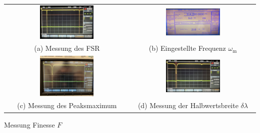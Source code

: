 \begin{center}
    \captionsetup{type=figure}
    \begin{tabular}{c c}
        \includegraphics[width=0.45\textwidth]{Bilder/Finess/finess_fsr_oszi.jpg} & \includegraphics[width=0.45\textwidth]{Bilder/Finess/finess_hf-generator.jpg}\\
        (a) Messung des FSR & (b) Eingestellte Frequenz  $\omega_\mathrm{m}$ \\[0,1cm]
        \includegraphics[width=0.45\textwidth]{Bilder/Finess/finess_max_oszi.jpg} & \includegraphics[width=0.45\textwidth]{Bilder/Finess/finess_hb_oszi.jpg}\\
        (c) Messung des Peaksmaximum & (d) Messung der Halbwertsbreite $\delta \lambda$ \\
    \end{tabular}
    \caption{Messung Finesse $F$}
    \label{fig:finess}
\end{center}

